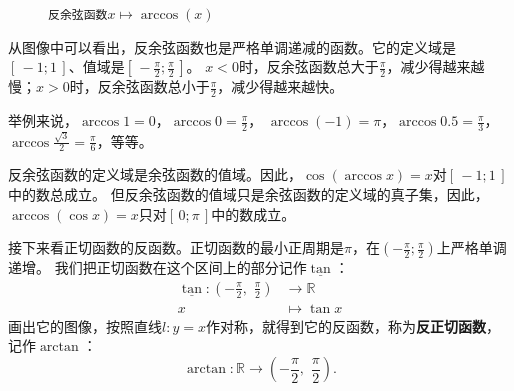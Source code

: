 \documentclass[12pt,UTF8,fontset=none]{ctexbook}
\begin{document}
\begin{figure}[h]
    \caption*{\texttt{反余弦函数}$x\mapsto \arccos(x)$}
\end{figure}

从图像中可以看出，反余弦函数也是严格单调递减的函数。它的定义域是$[\,-1; 1\,]$、值域是$[\,-\frac{\pi}{2}; \frac{\pi}{2}\,]$。
$x < 0$时，反余弦函数总大于$\frac{\pi}{2}$，减少得越来越慢；$x > 0$时，反余弦函数总小于$\frac{\pi}{2}$，减少得越来越快。

举例来说，$\arccos{1} = 0$，$\arccos{0} = \frac{\pi}{2}$，
$\arccos{(-1)} = \pi$，$\arccos{0.5} = \frac{\pi}{3}$，$\arccos{\frac{\sqrt{3}}{2}} = \frac{\pi}{6}$，等等。

反余弦函数的定义域是余弦函数的值域。因此，$\cos{(\arccos{x})} = x$对$[\,-1; 1\,]$中的数总成立。
但反余弦函数的值域只是余弦函数的定义域的真子集，因此，$\arccos{(\cos{x})} = x$只对$[\,0;\pi\,]$中的数成立。

接下来看正切函数的反函数。正切函数的最小正周期是$\pi$，在$(-\frac{\pi}{2}; \frac{\pi}{2})$上严格单调递增。
我们把正切函数在这个区间上的部分记作$\underline{\tan}$：
\begin{align*}
    \underline{\tan} : (-\frac{\pi}{2}, \,\, \frac{\pi}{2}) &\rightarrow \mathbb{R}  \\
                                                          x &\mapsto \tan{x} 
\end{align*}
画出它的图像，按照直线$l: y = x$作对称，就得到它的反函数，称为\textbf{反正切函数}，记作$\arctan$：
$$ \arctan : \mathbb{R} \rightarrow (-\frac{\pi}{2}, \,\, \frac{\pi}{2}) . $$
\end{document}
